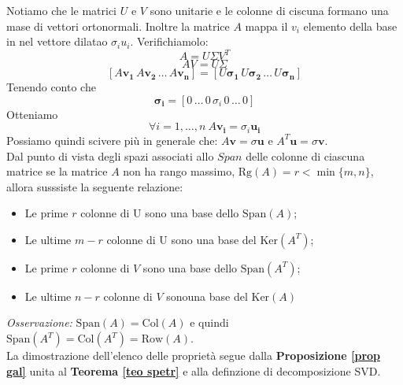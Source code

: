 \documentclass[11pt]{article}
\begin{document}
\noindent
Notiamo che le matrici $U$ e $V$ sono unitarie e le colonne di ciscuna formano una mase di vettori ortonormali. Inoltre la matrice $A$ mappa il $v_i$ elemento della base in nel vettore dilatao $\sigma_iu_i$.
\newpage
\noindent
Verifichiamolo:
\[
A = U\Sigma V^T 
\]
\[
AV = U\Sigma
\]
\[ 
[A\mathbf{v_1} \, A\mathbf{v_2} \, \dots \, A\mathbf{v_n}] = [U\mathbf{\sigma_1} \, U\mathbf{\sigma_2} \, \dots \, U\mathbf{\sigma_n}]
\]
Tenendo conto che 
\[
\mathbf{\sigma_i}=[0 \, \dots \, 0 \, \sigma_i \, 0 \, \dots \, 0]
\]
Otteniamo
$$\forall i=1,\dots,n\ A\mathbf{v_i}=\sigma_i\mathbf{u_i}
$$
Possiamo quindi scivere più in generale che:  $A\mathbf{v}=\sigma\mathbf{u}$ e $A^T\mathbf{u}=\sigma\mathbf{v}$.\\
Dal punto di vista degli spazi associati allo $Span$ delle colonne di ciascuna matrice se la matrice $A$ non ha rango massimo, $\text{Rg}(A)= r < \min{\{m,n\}}$, allora susssiste la seguente relazione:
\begin{itemize}
	\item Le prime $r$ colonne di U sono una base dello $\text{Span}(A)$;
	\item Le ultime $m-r$ colonne di U sono una base del $\text{Ker}(A^T)$;
	\item Le prime $r$ colonne di $V$ sono una base dello $\text{Span}(A^T)$;
	\item Le ultime $n-r$ colonne di $V$ sonouna base del $\text{Ker}(A)$
\end{itemize} 
\textit{Osservazione:} $\text{Span}(A)=\text{Col}(A)$ e quindi $\text{Span}(A^T)=\text{Col}(A^T)=\text{Row}(A)$.\\
La dimostrazione dell'elenco delle proprietà segue dalla \textbf{Proposizione \ref{prop gal}} unita al \textbf{Teorema \ref{teo spetr}} e alla definzione di decomposizione SVD.
\end{document}
